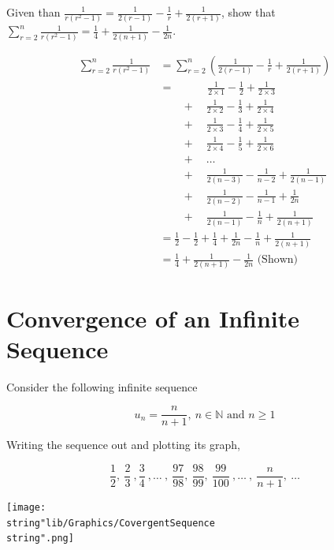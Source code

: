 \documentclass[11pt,a4paper]{book}
\newcommand{\N}{\mathbb{N}}
\begin{document}
\begin{example} 

Given than ${\displaystyle \frac{1}{r\left(r^{2}-1\right)}=\frac{1}{2\left(r-1\right)}-\frac{1}{r}+\frac{1}{2\left(r+1\right)}}$,
show that ${\displaystyle \sum_{r=2}^{n}\frac{1}{r\left(r^{2}-1\right)}=\frac{1}{4}+\frac{1}{2\left(n+1\right)}-\frac{1}{2n}}$.

\Solution

\begin{align*}
\sum_{r=2}^{n}\frac{1}{r\left(r^{2}-1\right)} & =\sum_{r=2}^{n}\left(\frac{1}{2\left(r-1\right)}-\frac{1}{r}+\frac{1}{2\left(r+1\right)}\right)\\
 & =\qquad\quad\frac{1}{2\times1}-\frac{1}{2}+\frac{1}{2\times3}\\
 & \qquad+\quad\frac{1}{2\times2}-\frac{1}{3}+\frac{1}{2\times4}\\
 & \qquad+\quad\frac{1}{2\times3}-\frac{1}{4}+\frac{1}{2\times5}\\
 & \qquad+\quad\frac{1}{2\times4}-\frac{1}{5}+\frac{1}{2\times6}\\
 & \qquad+\quad\ldots\\
 & \qquad+\quad\frac{1}{2\left(n-3\right)}-\frac{1}{n-2}+\frac{1}{2\left(n-1\right)}\\
 & \qquad+\quad\frac{1}{2\left(n-2\right)}-\frac{1}{n-1}+\frac{1}{2n}\\
 & \qquad+\quad\frac{1}{2\left(n-1\right)}-\frac{1}{n}+\frac{1}{2\left(n+1\right)}\\
 & =\frac{1}{2}-\frac{1}{2}+\frac{1}{4}+\frac{1}{2n}-\frac{1}{n}+\frac{1}{2\left(n+1\right)}\\
 & =\frac{1}{4}+\frac{1}{2\left(n+1\right)}-\frac{1}{2n}\text{ (Shown)}
\end{align*}

\end{example}

\newpage{}

\section{Convergence of an Infinite Sequence}

Consider the following infinite sequence

\[
u_{n}=\frac{n}{n+1},\:n\in\N\text{ and }n\geq1
\]

Writing the sequence out and plotting its graph, 

\begin{minipage}{0.5\textwidth} 

\[
\frac{1}{2},\:\frac{2}{3}\:,\frac{3}{4}\:,\ldots\:,\:\frac{97}{98},\:\frac{98}{99},\:\frac{99}{100}\:,\ldots\:,\:\frac{n}{n+1},\:\ldots
\]

\end{minipage}
\begin{minipage}{0.5\textwidth} 
\begin{center}
\texttt{[image: \\string"lib/Graphics/CovergentSequence\\string".png]}
\par\end{center}

\end{minipage}
\end{document}
